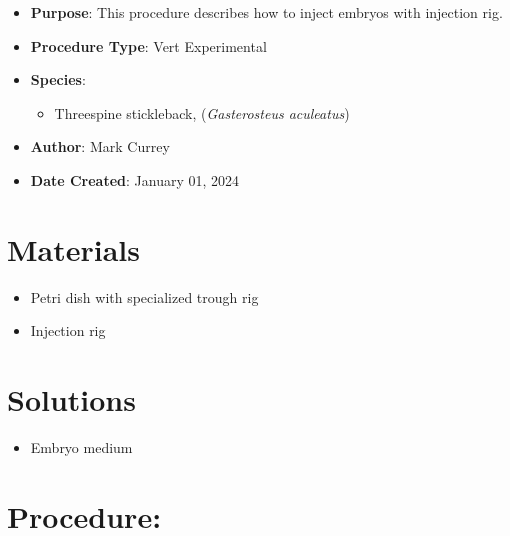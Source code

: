 \documentclass[
  letterpaper,
  DIV=11,
  numbers=noendperiod]{scrreprt}
\providecommand{\tightlist}{%
  \setlength{\itemsep}{0pt}\setlength{\parskip}{0pt}}\usepackage{longtable,booktabs,array}
\begin{document}
\begin{itemize}
\tightlist
\item
  \textbf{Purpose}: This procedure describes how to inject embryos with
  injection rig.
\item
  \textbf{Procedure Type}: Vert Experimental
\item
  \textbf{Species}:

  \begin{itemize}
  \tightlist
  \item
    Threespine stickleback, (\emph{Gasterosteus aculeatus})
  \end{itemize}
\item
  \textbf{Author}: Mark Currey\\
\item
  \textbf{Date Created}: January 01, 2024
\end{itemize}

\hypertarget{materials-71}{%
\section{Materials}\label{materials-71}}

\begin{itemize}
\tightlist
\item
  Petri dish with specialized trough rig
\item
  Injection rig
\end{itemize}

\hypertarget{solutions-63}{%
\section{Solutions}\label{solutions-63}}

\begin{itemize}
\tightlist
\item
  Embryo medium
\end{itemize}

\hypertarget{procedure-70}{%
\section{Procedure:}\label{procedure-70}}
\end{document}
